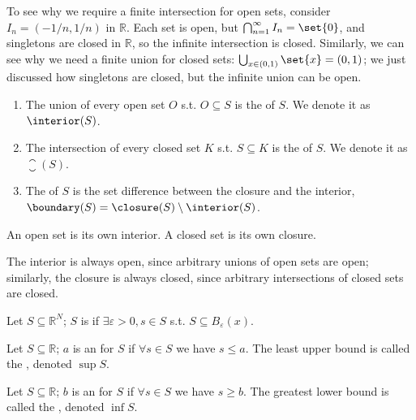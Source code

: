 \documentclass{article}
\begin{document}
To see why we require a finite intersection for open sets, consider $I_n = (-1/n, 1/n)$ in $\mathbb{R}$. Each set is open, but $\bigcap^{\infty}_{n = 1} I_n = \set{0}$, and singletons are closed in $\mathbb{R}$, so the infinite intersection is closed. Similarly, we can see why we need a finite union for closed sets: $\bigcup_{x \in (0, 1)} \set{x} = (0, 1)$; we just discussed how singletons are closed, but the infinite union can be open.
\begin{definition}\label{def:lecture1_interior_closure_boundary}
  \begin{enumerate}
    \item The union of every open set $O$ s.t. $O \subseteq S$ is the  of $S$. We denote it as $\interior(S)$.

    \item The intersection of every closed set $K$ s.t. $S \subseteq K$ is the  of $S$. We denote it as $\closure(S)$.

    \item The  of $S$ is the set difference between the closure and the interior, $\boundary(S) = \closure(S) \setminus \interior(S)$.
  \end{enumerate}
\end{definition}

\begin{claim}
  An open set is its own interior. A closed set is its own closure.
\end{claim}

The interior is always open, since arbitrary unions of open sets are open; similarly, the closure is always closed, since arbitrary intersections of closed sets are closed.
\begin{definition}
  Let $S \subseteq \mathbb{R}^N$; $S$ is  if $\exists \varepsilon > 0, s \in S$ s.t. $S \subseteq B_{\varepsilon}(x)$.
\end{definition}

\begin{definition}
  Let $S \subseteq \mathbb{R}$; $a$ is an  for $S$ if $\forall s \in S$ we have $s \le a$. The least upper bound is called the , denoted $\sup S$.
\end{definition}

\begin{definition}
  Let $S \subseteq \mathbb{R}$; $b$ is an  for $S$ if $\forall s \in S$ we have $s \ge b$. The greatest lower bound is called the , denoted $\inf S$.
\end{definition}
\end{document}

